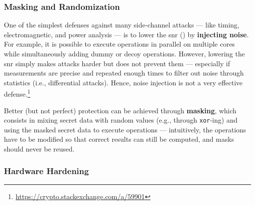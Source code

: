 
\subsubsection{Masking and Randomization}\label{sec:security_of_cryptographic_algorithms:best_practices:mask}

One of the simplest defenses against many side-channel attacks --- like timing, electromagnetic, and power analysis --- is to lower the \gls{snr} () by \textbf{injecting noise}. For example, it is possible to execute operations in parallel on multiple cores while simultaneously adding dummy or decoy operations. However, lowering the \gls{snr} simply makes attacks harder but does not prevent them --- especially if measurements are precise and repeated enough times to filter out noise through statistics (i.e., differential attacks). Hence, noise injection is not a very effective defense.\footnote{\url{https://crypto.stackexchange.com/a/59901}}

Better (but not perfect) protection can be achieved through \textbf{masking}, which consists in mixing secret data with random values (e.g., through \texttt{xor}-ing) and using the masked secret data to execute operations --- intuitively, the operations have to be modified so that correct results can still be computed, and masks should never be reused. 


\subsubsection{Hardware Hardening}\label{sec:security_of_cryptographic_algorithms:best_practices:hardware}

